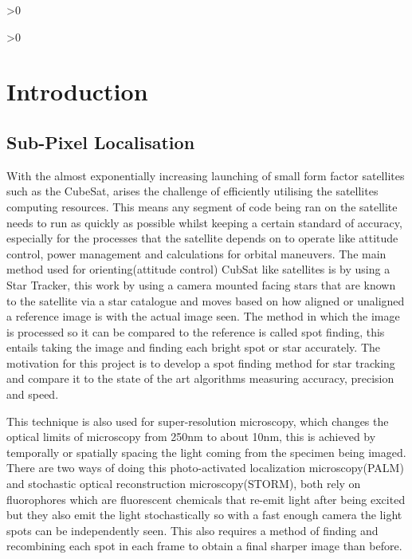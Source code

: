 \documentclass[aps,pra,a4paper,nofootinbib,onecolumn,tightenlines,longbibliography,12pt,amsfonts,amssymb,amsmath,floatfix]{revtex4-2} %
\begin{document}
\newpage
\tableofcontents %
\makeatletter
\let\toc@pre\relax
\let\toc@post\relax
\makeatother

\ifnum\totalfigures>0
\newpage
\listoffigures
{}
\fi

\ifnum\totaltables>0
\newpage
\listoftables
{}
\fi





\newpage
{}

\section{Introduction}

  \subsection{Sub-Pixel Localisation} %
  \label{sub:spot-finding intro}
  
  
  With the almost exponentially increasing launching of small form factor
  satellites such as the CubeSat, arises the challenge of efficiently utilising
  the satellites computing resources. This means any segment of code being ran on
  the satellite needs to run as quickly as possible whilst keeping a certain
  standard of accuracy, especially for the processes that the satellite depends
  on to operate like attitude control, power management and calculations for
  orbital maneuvers. The main method used for orienting(attitude control) CubSat
  like satellites is by using a Star Tracker, this work by using a camera mounted
  facing stars that are known to the satellite via a star catalogue and moves
  based on how aligned or unaligned a reference image is with the actual image
  seen.\cite{calitz2015design} The method in which the image is processed so it
  can be compared to the reference is called spot finding, this entails taking
  the image and finding each bright spot or star accurately. The motivation for
  this project is to develop a spot finding method for star tracking and compare
  it to the state of the art algorithms measuring accuracy, precision and speed.
  
  This technique is also used for super-resolution microscopy, which changes the
  optical limits of microscopy from 250nm to about 10nm, this is achieved by
  temporally or spatially spacing the light coming from the specimen being
  imaged. There are two ways of doing this photo-activated localization
  microscopy(PALM) and stochastic optical reconstruction microscopy(STORM), both
  rely on fluorophores which are fluorescent chemicals that re-emit light after
  being excited but they also emit the light stochastically so with a fast enough
  camera the light spots can be independently seen. This also requires a method
  of finding and recombining each spot in each frame to obtain a final sharper
  image than before.\cite{small2014fluorophore}
  
\end{document}

